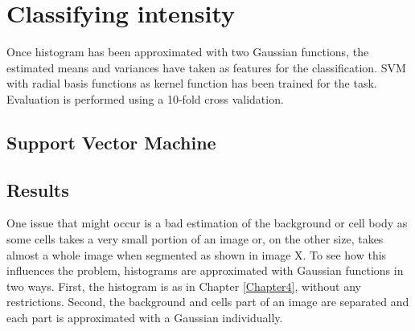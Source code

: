 \section{Classifying intensity}

Once histogram has been approximated with two Gaussian functions, the estimated means and variances have taken as features for the classification. SVM with radial basis functions as kernel function has been trained for the task. Evaluation is performed using a 10-fold cross validation. \\

\subsection{Support Vector Machine}

\subsection{Results}

One issue that might occur is a bad estimation of the background or cell body as some cells takes a very small portion of an image or, on the other size, takes almost a whole image when segmented as shown in image X. To see how this influences the problem, histograms are approximated with Gaussian functions in two ways. First, the histogram is as in Chapter \ref{Chapter4}, without any restrictions. Second, the background and cells part of an image are separated and each part is approximated with a Gaussian individually. 